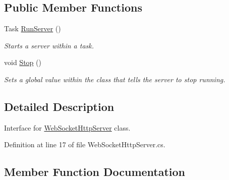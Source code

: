 \subsection*{Public Member Functions}
\begin{DoxyCompactItemize}
\item 
Task \mbox{\hyperlink{interface_simple_web_socket_server_library_1_1_simple_web_socket_http_server_1_1_i_web_socket_http_server_ace7dda0ccffcbf99eb142e0b33ed3f54}{Run\+Server}} ()
\begin{DoxyCompactList}\small\item\em Starts a server within a task. \end{DoxyCompactList}\item 
void \mbox{\hyperlink{interface_simple_web_socket_server_library_1_1_simple_web_socket_http_server_1_1_i_web_socket_http_server_a73208116838cad69e1a7198ccfc89bbf}{Stop}} ()
\begin{DoxyCompactList}\small\item\em Sets a global value within the class that tells the server to stop running. \end{DoxyCompactList}\end{DoxyCompactItemize}


\subsection{Detailed Description}
Interface for \mbox{\hyperlink{class_simple_web_socket_server_library_1_1_simple_web_socket_http_server_1_1_web_socket_http_server}{Web\+Socket\+Http\+Server}} class. 



Definition at line 17 of file Web\+Socket\+Http\+Server.\+cs.



\subsection{Member Function Documentation}
\mbox{\label{interface_simple_web_socket_server_library_1_1_simple_web_socket_http_server_1_1_i_web_socket_http_server_ace7dda0ccffcbf99eb142e0b33ed3f54}} 
